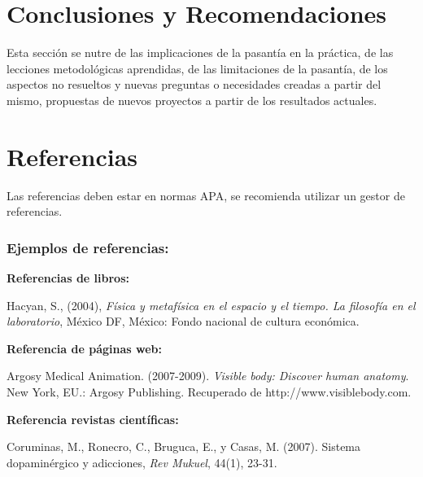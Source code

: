 \documentclass[12pt,letterpaper]{report}
\begin{document}
%

\chapter{Conclusiones y Recomendaciones}

Esta sección se nutre de las implicaciones de la pasantía en la práctica, de las lecciones metodológicas aprendidas, de las limitaciones de la pasantía, de los aspectos no resueltos y nuevas preguntas o necesidades creadas a partir del mismo, propuestas de nuevos proyectos a partir de los resultados actuales.

\chapter{Referencias}

Las referencias deben estar en normas APA, se recomienda utilizar un gestor de referencias.

\subsection*{Ejemplos de referencias:}

\textbf{Referencias de libros:}

Hacyan, S., (2004), \textit{Física y metafísica en el espacio y el tiempo. La filosofía en el laboratorio}, México DF, México: Fondo nacional de cultura económica.

\vspace{6pt}
\textbf{Referencia de páginas web:}

Argosy Medical Animation. (2007-2009). \textit{Visible body: Discover human anatomy}. New York, EU.: Argosy Publishing. Recuperado de http://www.visiblebody.com.

\vspace{6pt}
\textbf{Referencia revistas científicas:}

Coruminas, M., Ronecro, C., Bruguca, E., y Casas, M. (2007). Sistema dopaminérgico y adicciones, \textit{Rev Mukuel}, 44(1), 23-31.
\end{document}
